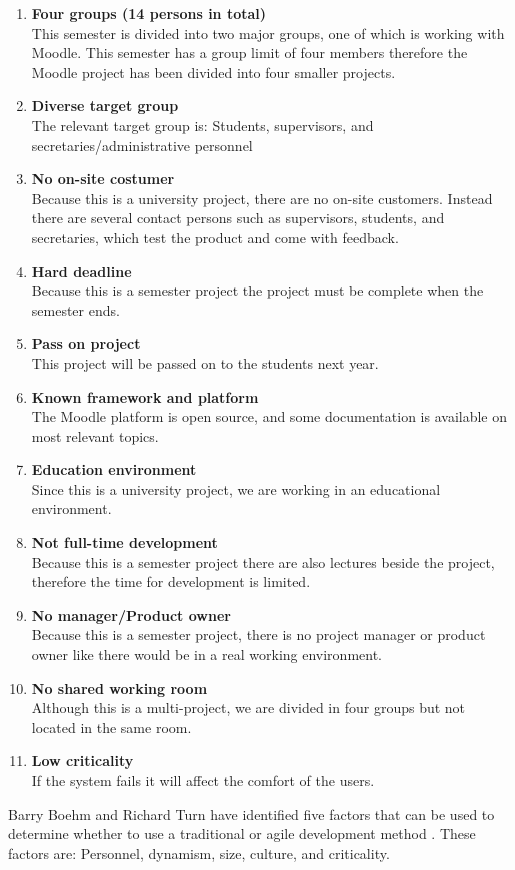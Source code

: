 \begin{enumerate}
	\item \textbf{Four groups (14 persons in total)} \label{enum:groupSize}\\
	This semester is divided into two major groups, one of which is working with Moodle. 
	This semester has a group limit of four members therefore the Moodle project has been divided into four smaller projects.
	\item \textbf{Diverse target group} \label{enum:targetGroup}\\ 
	The relevant target group is: Students, supervisors, and secretaries/administrative personnel 
	\item \textbf{No on-site costumer} \label{enum:onsite}\\
	Because this is a university project, there are no on-site customers. 
	Instead there are several contact persons such as supervisors, students, and secretaries, which test the product and come with feedback.
	\item \textbf{Hard deadline} \label{enum:deadline}\\
	Because this is a semester project the project must be complete when the semester ends.
	\item \textbf{Pass on project} \label{enum:passed}\\
	This project will be passed on to the students next year.
	\item \textbf{Known framework and platform} \label{enum:framework}\\
	The Moodle platform is open source, and some documentation is available on most relevant topics.
	\item \textbf{Education environment} \label{enum:education}\\
	Since this is a university project, we are working in an educational environment.
	\item \textbf{Not full-time development} \label{enum:halftime}\\
	Because this is a semester project there are also lectures beside the project, therefore the time for development is limited. 
	\item \textbf{No manager/Product owner} \label{enum:manager}\\
	Because this is a semester project, there is no project manager or product owner like there would be in a real working environment.
	\item \textbf{No shared working room} \label{enum:room}\\
	Although this is a multi-project, we are divided in four groups but not located in the same room.
	\item \textbf{Low criticality} \label{enum:criticality}\\
	If the system fails it will affect the comfort of the users.
\end{enumerate}
Barry Boehm and Richard Turn have identified five factors that can be used to determine whether to use a traditional or agile development method \citep{boehmTurner}.
These factors are: Personnel, dynamism, size, culture, and criticality.

